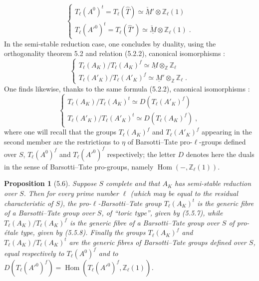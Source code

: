 \documentclass[11pt]{article}
\newtheorem{proposition}{Proposition}[section]
\newcommand{\Hom}{\operatorname{Hom}}
\newcommand{\ZZ}{\mathbb Z}
\newcommand{\Tl}{T_{\ell}}
\begin{document}
\begin{equation}
\begin{cases}
\Tl(A^0)^t = \Tl(\hat{T}) \simeq \check{\underline{M}}' \otimes
\ZZ_{\ell}(1) \\[1ex]
\Tl(A'^0)^t = \Tl(\hat{T}') \simeq \check{\underline{M}} \otimes
\ZZ_{\ell}(1) \; .
\end{cases}
\end{equation}
In the semi-stable reduction case, one concludes by duality, using the
orthogonality theorem 5.2 and relation (5.2.2), canonical isomorphisms :
\begin{equation}
\begin{cases}
\Tl(A_K)/\Tl(A_K)^f \simeq \underline{M} \otimes_{\ZZ} \ZZ_{\ell}
\\[1ex]
\Tl(A'_K)/\Tl(A'_K)^f \simeq \underline{M}' \otimes_{\ZZ} \ZZ_{\ell}
\; .
\end{cases}
\end{equation}
One finds likewise, thanks to the same formula (5.2.2), canonical
isomorphisms :
\begin{equation}
\begin{cases}
\Tl(A_K)/\Tl(A_K)^t \simeq D(\Tl(A'_K)^f) \\[1ex]
\Tl(A'_K)/\Tl(A'_K)^t \simeq D(\Tl(A_K)^f) \; ,
\end{cases}
\end{equation}
where one will recall that the groups $\Tl(A_K)^f$ and $\Tl(A'_K)^f$
appearing in the second member are the restrictions to $\eta$ of
Barsotti--Tate pro-$\ell$-groups defined over $S$, $\Tl(A^0)^f$ and
$\Tl(A'^0)^f$ respectively; the letter $D$ denotes here the duals in
the sense of Barsotti--Tate pro-groups, namely $\Hom(-, \ZZ_{\ell}(1))$.

\begin{proposition}[5.6]
Suppose $S$ complete and that $A_K$ has semi-stable reduction over $S$.
Then for every prime number $\ell$ (which may be equal to the residual
characteristic of $S$), the pro-$\ell$-Barsotti--Tate group
$\Tl(A_K)^t$ is the generic fibre of a Barsotti--Tate group over $S$,
of ``toric type'', given by (5.5.7), while $\Tl(A_K)/\Tl(A_K)^f$ is the
generic fibre of a Barsotti--Tate group over $S$ of pro-\'etale type,
given by (5.5.8). Finally the groups $\Tl(A_K)^f$ and
$\Tl(A_K)/\Tl(A_K)^t$ are the generic fibres of Barsotti--Tate groups
defined over $S$, equal respectively to $\Tl(A^0)^f$ and to
$D(\Tl(A'^0)^f) = \Hom(\Tl(A'^0)^f, \ZZ_{\ell}(1))$.
\end{proposition}
\end{document}
